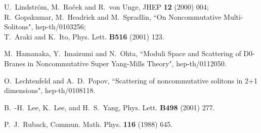 \documentclass[a4paper,12pt]{article}
\begin{document}
\begin{thebibliography}{99}
U.~Lindstr\"om, M.~Ro\v{c}ek and R.~von Unge, JHEP {\bf 12} (2000) 004; \\
R.~Gopakumar, M.~Headrick and M.~Spradlin, ``On Noncommutative Multi-Solitons", 
hep-th/0103256; \\
T.~Araki and K.~Ito, Phys. Lett. {\bf B516} (2001) 123. 

M.~Hamanaka, Y.~Imaizumi and N.~Ohta, 
``Moduli Space and Scattering of D0-Branes in Noncommutative Super Yang-Mills Theory", 
hep-th/0112050. 

O.~Lechtenfeld and A.~D.~Popov,
``Scattering of noncommutative solitons in 2+1 dimensions",
hep-th/0108118.

B.~-H.~Lee, K.~Lee, and H.~S.~Yang, Phys. Lett. {\bf B498} (2001) 277.

P.~J.~Ruback, Commun. Math. Phys. {\bf 116} (1988) 645.

\end{thebibliography}
\end{document}
